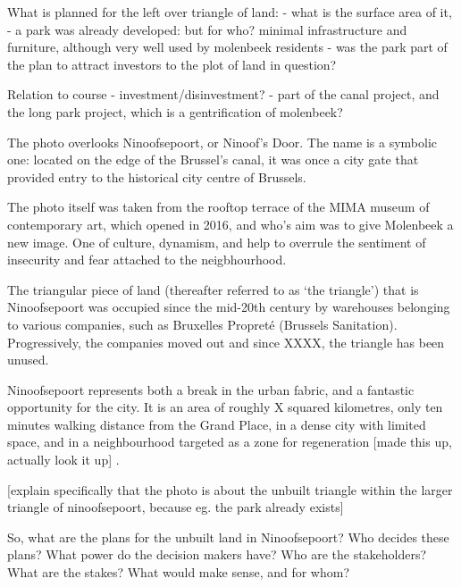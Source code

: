 \documentclass{article}[11pt]
\begin{document}
What is planned for the left over triangle of land:
- what is the surface area of it, 
- a park was already developed: but for who? minimal infrastructure and furniture, although very well used by molenbeek residents
- was the park part of the plan to attract investors to the plot of land in question?

Relation to course
- investment/disinvestment?
- part of the canal project, and the long park project, which is a gentrification of molenbeek? 



The photo overlooks Ninoofsepoort, or Ninoof's Door. The name is a symbolic one: located on the edge of the Brussel's canal, it was once a city gate that provided entry to the historical city centre of Brussels. 

The photo itself was taken from the rooftop terrace of the MIMA museum of contemporary art, which opened in 2016, and who's aim was to give Molenbeek a new image. One of culture, dynamism, and help to overrule the sentiment of insecurity and fear attached to the neigbhourhood.

The triangular piece of land (thereafter referred to as `the triangle') that is Ninoofsepoort was occupied since the mid-20th century by warehouses belonging to various companies, such as Bruxelles Propreté (Brussels Sanitation). Progressively, the companies moved out and since XXXX, the triangle has been unused. 

Ninoofsepoort represents both a break in the urban fabric, and a fantastic opportunity for the city. It is an area of roughly X squared kilometres, only ten minutes walking distance from the Grand Place, in a dense city with limited space, and in a neighbourhood targeted as a zone for regeneration [made this up, actually look it up] \parencite{required}.

[explain specifically that the photo is about the unbuilt triangle within the larger triangle of ninoofsepoort, because eg. the park already exists]

So, what are the plans for the unbuilt land in Ninoofsepoort? Who decides these plans? What power do the decision makers have? Who are the stakeholders? What are the stakes? What would make sense, and for whom? 
\end{document}
